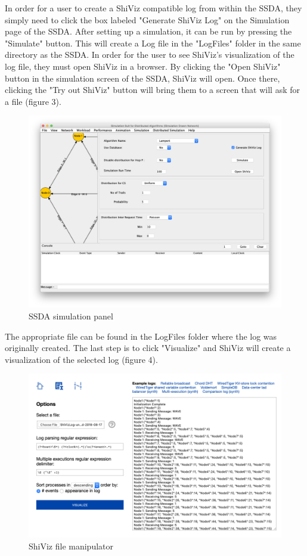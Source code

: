 \documentclass[12pt, oneside]{article}   	%
\begin{document}
In order for a user to create a ShiViz compatible log from within the SSDA, they simply need to click the box labeled "Generate ShiViz Log" on the Simulation page of the SSDA.  After setting up a simulation, it can be run by pressing the "Simulate" button.  This will create a Log file in the "LogFiles" folder in the same directory as the SSDA.  In order for the user to see ShiViz's visualization of the log file, they must open ShiViz in a browser.  By clicking the "Open ShiViz" button in the simulation screen of the SSDA, ShiViz will open.  Once there, clicking the "Try out ShiViz" button will bring them to a screen that will ask for a file (figure 3).
\begin{figure}[t!]
\caption{SSDA simulation panel}
\includegraphics[scale=0.3]{SSDA_Sim_Window.png} 
\centering
\end{figure}
The appropriate file can be found in the LogFiles folder where the log was originally created.  The last step is to click "Visualize" and ShiViz will create a visualization of the selected log (figure 4).
\begin{figure}[t!]
\caption{ShiViz file manipulator}
\includegraphics[scale=0.5]{ShiViz_File.png} 
\centering
\end{figure}
\end{document}

